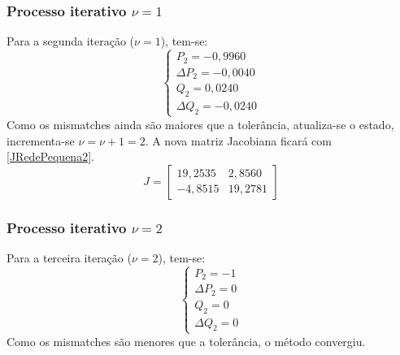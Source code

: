 \subsubsection{Processo iterativo $\nu=1$}
Para a segunda iteração ($\nu=1$), tem-se:
\begin{equation}
  \left\{    \begin{array}{llll}
                P_2= -0,9960\\
                \Delta P_2 = -0,0040\\
                Q_2 = 0,0240\\
                \Delta Q_2 = -0,0240
            \end{array}\right.
    \label{RedePequenaItera1}
\end{equation}
Como os mismatches ainda são maiores que a tolerância, atualiza-se o estado, incrementa-se $\nu=\nu+1=2$. A nova matriz Jacobiana ficará com \ref{JRedePequena2}.
\begin{equation}
   J = \left[ 
    \begin{matrix} 
        19,2535 & 2,8560  \\ 
        -4,8515 & 19,2781
    \end{matrix} \right] 
    \label{JRedePequena2}
\end{equation}
\subsubsection{Processo iterativo $\nu=2$}
Para a terceira iteração ($\nu=2$), tem-se:
\begin{equation}
  \left\{    \begin{array}{llll}
                P_2= -1\\
                \Delta P_2 = 0\\
                Q_2 = 0\\
                \Delta Q_2 = 0
            \end{array}\right.
    \label{RedePequenaItera2}
\end{equation}
Como os mismatches são menores que a tolerância, o método convergiu.
